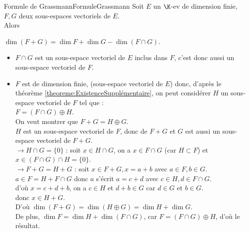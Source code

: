 \documentclass[12pt, a4paper]{report}
\begin{document}
\begin{theoreme}{Formule de Grassmann}{FormuleGrassmann}
Soit $E$ un $\K$-ev de dimension finie, $F,G$ deux sous-espaces vectoriels de $E$. \\
Alors 
\begin{center}
$\dim (F+G) = \dim F + \dim G - \dim (F \cap G)$.
\end{center}
\end{theoreme}

\begin{demo}
\begin{itemize}
	\item $F \cap G$ est un sous-espace vectoriel de $E$ inclus dans $F$, c'est donc aussi un sous-espace vectoriel de $F$. 
	\item $F$ est de dimension finie, (sous-espace vectoriel de $E$) donc, d'après le théorème \ref{theoreme:ExistenceSupplémentaire}, on peut considérer $H$ un sous-espace vectoriel de $F$ tel que : \\
	$F = (F \cap G) \oplus H$. \\
	
	On veut montrer que $F+G = H \oplus G$. \\
	$H$ est un sous-espace vectoriel de $F$, donc de $F+G$ et $G$ est aussi un sous-espace vectoriel de $F+G$. \\
	$\longrightarrow H \cap G = \{0\}$ : soit $x \in H \cap G$, on a $x \in F \cap G$ (car $H \subset F$) et $x \in (F \cap G) \cap H = \{0\}$. \\
	$\longrightarrow F+G = H+G$ : soit $x \in F+G, x = a+b$ avec $a \in F, b \in G$. \\
	$a\in F = H+F\cap G$ donc $a$ s'écrit $a = c+d$ avec $c\in H, d \in F \cap G$. \\
	d'où $x = c+d+b$, on a $c \in H$ et $d+b \in G$ car $d \in G$ et $b \in G$. \\
	donc $x \in H+G$. \\
	
	D'où $\dim (F+G) = \dim (H \oplus G) = \dim H + \dim G$. \\
	De plus, $\dim F = \dim H + \dim (F \cap G)$, car $F = (F\cap G) \oplus H$, d'où le résultat.

\end{itemize}
\end{demo}
\end{document}
